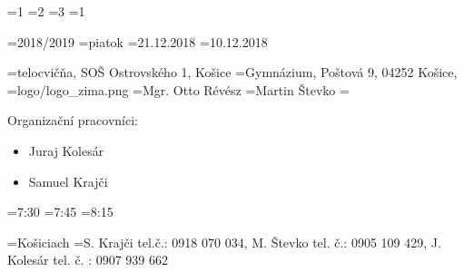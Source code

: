 \kolo={1}                                   %
\sezona={2}                                 %
\postupujuci={3}                            %
\cap={1}                                    %

\rok={2018/2019}                            %
\den={piatok}                               %
\termin={21.12.2018}                        %
\terminPrihlasky={10.12.2018}               %

\miesto={telocvičňa, SOŠ Ostrovského 1, Košice}       %
\usporiadatel={Gymnázium, Poštová 9, 04252 Košice, }  %
\obrazokURL={logo/logo_zima.png}                        %
\riaditel={Mgr. Otto Révész}                          %
\delegat={Martin Števko}                              %
\organizacia={%
\item Organizační pracovníci: 
\begin{itemize}
\setlength{\itemindent}{15pt}
    \item Juraj Kolesár
    \item Samuel Krajči
\end{itemize}%
}                                                     %

\casPrichodu={7:30}      %
\casPorady={7:45}        %
\zaciatok={8:15}         %

\vMeste={Košiciach}                     %
\kontakt={S. Krajči tel.č.: 0918 070 034, M. Števko tel. č.: 0905 109 429, J. Kolesár  tel. č. : 0907 939 662}        %